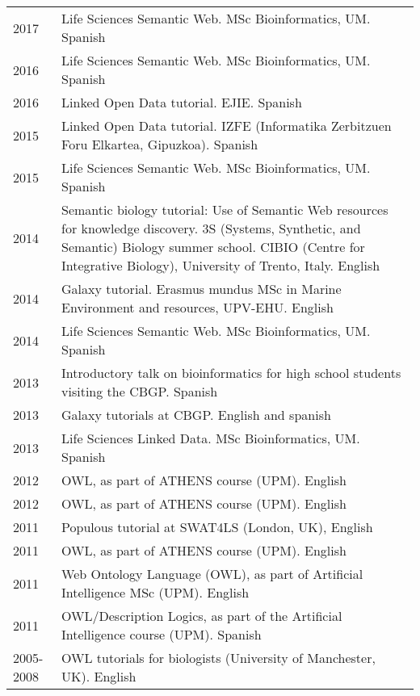 \documentclass[11pt,fullpage]{article}
\begin{document}
\begin{longtable}{p{0.5in}|p{5.5in}}

2017 & Life Sciences Semantic Web. MSc Bioinformatics, UM. Spanish \\
2016 & Life Sciences Semantic Web. MSc Bioinformatics, UM. Spanish \\
2016 & Linked Open Data tutorial. EJIE. Spanish \\
2015 & Linked Open Data tutorial. IZFE (Informatika Zerbitzuen Foru Elkartea, Gipuzkoa). Spanish \\
2015 & Life Sciences Semantic Web. MSc Bioinformatics, UM. Spanish \\
2014 & Semantic biology tutorial: Use of Semantic Web resources for knowledge discovery. 3S (Systems, Synthetic, and Semantic) Biology summer school. CIBIO (Centre for Integrative Biology), University of Trento, Italy. English \\
2014 & Galaxy tutorial. Erasmus mundus MSc in Marine Environment and resources, UPV-EHU. English \\
2014 & Life Sciences Semantic Web. MSc Bioinformatics, UM. Spanish \\ %
2013 & Introductory talk on bioinformatics for high school students visiting the CBGP. Spanish \\
2013 & Galaxy tutorials at CBGP. English and spanish \\ %
2013 & Life Sciences Linked Data. MSc Bioinformatics, UM. Spanish \\
2012 & OWL, as part of ATHENS course (UPM). English \\
2012 & OWL, as part of ATHENS course (UPM). English \\
2011 & Populous tutorial at SWAT4LS (London, UK), English \\
2011 & OWL, as part of ATHENS course (UPM). English \\
2011 & Web Ontology Language (OWL), as part of Artificial Intelligence MSc (UPM). English \\ %
2011 & OWL/Description Logics, as part of the Artificial Intelligence course (UPM). Spanish \\ %
2005-2008 & OWL tutorials for biologists (University of Manchester, UK). English \\

\end{longtable}
\end{document}
